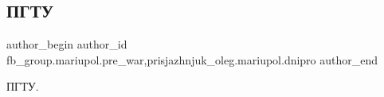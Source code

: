  
 
 
 
 

\subsection{ПГТУ}
\label{sec:19_02_2023.fb.fb_group.mariupol.pre_war.2.pgtu}
 
\ifcmt
 author_begin
   author_id fb_group.mariupol.pre_war,prisjazhnjuk_oleg.mariupol.dnipro
 author_end
\fi

ПГТУ.


